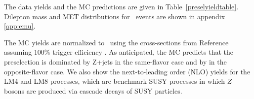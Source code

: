 

The data yields and the MC predictions are given in Table~\ref{preselyieldtable}.
Dilepton mass and MET distributions for \emu ~events are shown in appendix \ref{app:emu}.

The MC yields are normalized to \lumi\ using the cross-sections
from Reference~\cite{ref:xsec} assuming 100\% trigger efficiency 
.
As anticipated, the MC predicts that the preselection is dominated by Z+jets in the same-flavor 
case and by \ttbar in the opposite-flavor case.  
We also show the %
next-to-leading order (NLO) %
yields for the LM4 and LM8 processes, which are benchmark
SUSY processes in which $Z$ bosons are produced via cascade decays of SUSY particles. 




